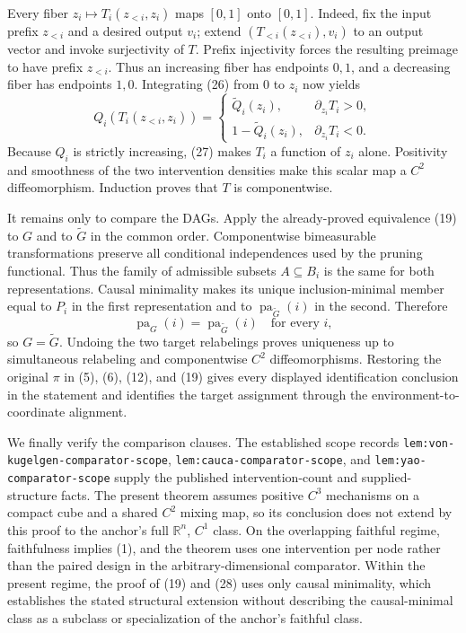Every fiber \(z_i\mapsto T_i(z_{<i},z_i)\) maps \([0,1]\) onto \([0,1]\).  Indeed, fix the input prefix \(z_{<i}\) and a desired output \(v_i\); extend \((T_{<i}(z_{<i}),v_i)\) to an output vector and invoke surjectivity of \(T\).  Prefix injectivity forces the resulting preimage to have prefix \(z_{<i}\).  Thus an increasing fiber has endpoints \(0,1\), and a decreasing fiber has endpoints \(1,0\).  Integrating (26) from \(0\) to \(z_i\) now yields
\[
 Q_i(T_i(z_{<i},z_i))=
 \begin{cases}
 \widetilde Q_i(z_i),&\partial_{z_i}T_i>0,\\[3pt]
 1-\widetilde Q_i(z_i),&\partial_{z_i}T_i<0.
 \end{cases}
\tag{27}
\]
Because \(Q_i\) is strictly increasing, (27) makes \(T_i\) a function of \(z_i\) alone.  Positivity and smoothness of the two intervention densities make this scalar map a \(C^2\) diffeomorphism.  Induction proves that \(T\) is componentwise.

It remains only to compare the DAGs.  Apply the already-proved equivalence (19) to \(G\) and to \(\widetilde G\) in the common order.  Componentwise bimeasurable transformations preserve all conditional independences used by the pruning functional.  Thus the family of admissible subsets \(A\subseteq B_i\) is the same for both representations.  Causal minimality makes its unique inclusion-minimal member equal to \(P_i\) in the first representation and to \(\operatorname{pa}_{\widetilde G}(i)\) in the second.  Therefore
\[
 \operatorname{pa}_G(i)=\operatorname{pa}_{\widetilde G}(i)
 \quad\text{for every }i,
\tag{28}
\]
so \(G=\widetilde G\).  Undoing the two target relabelings proves uniqueness up to simultaneous relabeling and componentwise \(C^2\) diffeomorphisms.  Restoring the original \(\pi\) in (5), (6), (12), and (19) gives every displayed identification conclusion in the statement and identifies the target assignment through the environment-to-coordinate alignment.

We finally verify the comparison clauses.  The established scope records \texttt{lem:von-kugelgen-comparator-scope}, \texttt{lem:cauca-comparator-scope}, and \texttt{lem:yao-comparator-scope} supply the published intervention-count and supplied-structure facts.  The present theorem assumes positive \(C^3\) mechanisms on a compact cube and a shared \(C^2\) mixing map, so its conclusion does not extend by this proof to the anchor's full \(\mathbb R^n\), \(C^1\) class.  On the overlapping faithful regime, faithfulness implies (1), and the theorem uses one intervention per node rather than the paired design in the arbitrary-dimensional comparator.  Within the present regime, the proof of (19) and (28) uses only causal minimality, which establishes the stated structural extension without describing the causal-minimal class as a subclass or specialization of the anchor's faithful class.

